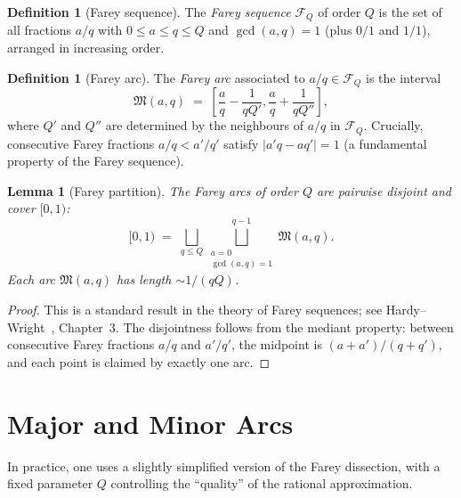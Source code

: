 \documentclass[12pt,a4paper]{amsart}
\newtheorem{lemma}[theorem]{Lemma}
\theoremstyle{definition}
\newtheorem{definition}[theorem]{Definition}
\begin{document}
\begin{definition}[Farey sequence]
  The \emph{Farey sequence} $\mathcal{F}_Q$ of order $Q$ is the
  set of all fractions $a/q$ with $0 \leq a \leq q \leq Q$ and
  $\gcd(a, q) = 1$ (plus $0/1$ and $1/1$), arranged in increasing order.
\end{definition}

\begin{definition}[Farey arc]
  The \emph{Farey arc} associated to $a/q \in \mathcal{F}_Q$ is the
  interval
  \[
    \mathfrak{M}(a, q)
    \;=\; \left[\frac{a}{q} - \frac{1}{qQ'}, \frac{a}{q} + \frac{1}{qQ''}\right],
  \]
  where $Q'$ and $Q''$ are determined by the neighbours of $a/q$ in
  $\mathcal{F}_Q$.  Crucially, consecutive Farey fractions $a/q < a'/q'$
  satisfy $|a'q - aq'| = 1$ (a fundamental property of the Farey sequence).
\end{definition}

\begin{lemma}[Farey partition]\label{lem:farey}
  The Farey arcs of order $Q$ are pairwise disjoint and cover $[0,1)$:
  \[
    [0, 1) \;=\; \bigsqcup_{q \leq Q} \bigsqcup_{\substack{a=0\\ \gcd(a,q)=1}}^{q-1}
                 \mathfrak{M}(a, q).
  \]
  Each arc $\mathfrak{M}(a, q)$ has length $\sim 1/(qQ)$.
\end{lemma}

\begin{proof}
  This is a standard result in the theory of Farey sequences; see
  Hardy--Wright~\cite{HardyWright}, Chapter~3.  The disjointness follows
  from the mediant property: between consecutive Farey fractions $a/q$
  and $a'/q'$, the midpoint is $(a+a')/(q+q')$, and each point is
  claimed by exactly one arc.
\end{proof}

\section{Major and Minor Arcs}
\label{sec:arcs}

In practice, one uses a slightly simplified version of the Farey
dissection, with a fixed parameter $Q$ controlling the ``quality'' of
the rational approximation.
\end{document}
